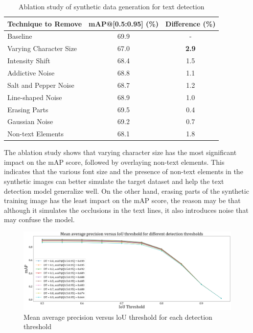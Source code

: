 \documentclass[12pt,twoside]{report}
\begin{document}
\begin{table}[htbp]
    \centering
    \begin{tabular}{lcc}
        \toprule
        Technique to Remove & mAP@[0.5:0.95] (\%) & Difference (\%) \\
        \midrule
        Baseline & 69.9 & - \\
        Varying Character Size & 67.0 & \textbf{2.9} \\
        Intensity Shift & 68.4 & 1.5 \\
        Addictive Noise & 68.8 & 1.1 \\
        Salt and Pepper Noise & 68.7 & 1.2 \\
        Line-shaped Noise & 68.9 & 1.0 \\
        Erasing Parts  & 69.5 & 0.4 \\
        Gaussian Noise & 69.2 & 0.7 \\
        Non-text Elements & 68.1 & 1.8 \\
        \bottomrule
    \end{tabular}
    \caption{Ablation study of synthetic data generation for text detection}
    \label{tab:map_ablation}
\end{table}

The ablation study shows that varying character size has the most significant impact on the mAP score, followed by overlaying non-text elements. This indicates that the various font size and the presence of non-text elements in the synthetic images can better simulate the target dataset and help the text detection model generalize well. On the other hand, erasing parts of the synthetic training image has the least impact on the mAP score, the reason may be that although it simulates the occlusions in the text lines, it also introduces noise that may confuse the model.

\begin{figure}[htbp]
    \centering
    \includegraphics[width=\textwidth]{./figures/map1.png}
    \caption{Mean average precision versus loU threshold for each detection threshold}
    \label{fig:map1}
\end{figure}
\end{document}
